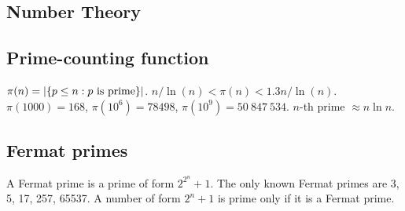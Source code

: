 \documentclass[12pt]{extarticle}
\begin{document}
\begin{multicols*}{2}




\section{Number Theory}


\subsection{Prime-counting function} $\pi(n) = |\{p \le n : p \hbox{ is prime}\}|$.
$n/\ln(n) < \pi(n) < 1.3 n/\ln(n)$.
$\pi(1000) = 168$, $\pi(10^6) = 78498$, $\pi(10^9) = 50\ 847\ 534$.
\quad $n$-th prime $\approx n \ln n$.

\subsection{Fermat primes}  A Fermat prime is a prime of form $2^{2^n}+1$.
The only known Fermat primes are 3, 5, 17, 257, 65537.
A number of form $2^n+1$ is prime only if it is a Fermat prime.



\end{multicols*}
\end{document}
